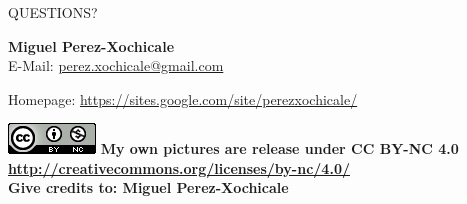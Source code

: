 \documentclass{beamer}
\begin{document}
\begin{frame}
\frametitle{}

\vspace{2cm}
\begin{center}
\LARGE{QUESTIONS?} 
\end{center}

\vspace{1cm}

\normalsize 
\textbf{Miguel Perez-Xochicale} \\

E-Mail: {\color{blue} \href{mailto:perez.xochicale@gmail.com}{perez.xochicale@gmail.com} } 

Homepage:
{\color{blue} \href{https://sites.google.com/site/perezxochicale/}{https://sites.google.com/site/perezxochicale/} }
\vspace{1cm}


\includegraphics[scale=.4]{CC4}
\tiny{ 
\textbf{My own pictures are release under CC BY-NC 4.0
{\color{blue} \href{http://creativecommons.org/licenses/by-nc/4.0/}{http://creativecommons.org/licenses/by-nc/4.0/} } \\
Give credits to: Miguel Perez-Xochicale
}
}

\end{frame}

% 
\end{document}
